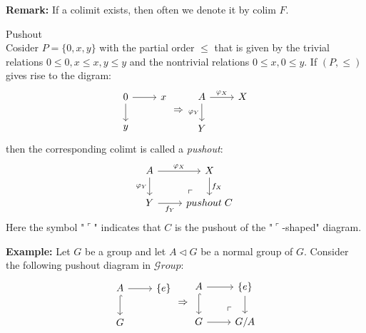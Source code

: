 \noindent\textbf{Remark:} If a colimit exists, then often we denote it by colim $F$.

\begin{definition}{Pushout}\\
Cosider $P= \{0,x,y\}$ with the partial order $\leq$ that is given by the trivial relations $0\leq 0, x\leq x, y\leq y$ and the nontrivial relations $0 \leq x, 0\leq y$. If $(P,\leq)$ gives rise to the digram:
$$\begin{tikzcd}
    0 \arrow[r] \arrow[d] &x\\
    y
\end{tikzcd} \Rightarrow \begin{tikzcd}
    A \arrow[r, "\varphi_X"] \arrow[d, "\varphi_Y"'] &X\\
    Y
\end{tikzcd}$$
then the corresponding colimt is called a \textit{pushout}:
$$\begin{tikzcd}
    A \arrow[r, "\varphi_X"] \arrow[d, "\varphi_Y"'] &X \arrow[d, "f_X"] \\
    Y \arrow[r, "f_Y"'] &pushout \; C \arrow[ul, phantom, "\ulcorner", pos=0.1]
\end{tikzcd}$$
Here the symbol "$\ulcorner$" indicates that $C$ is the pushout of the "$\ulcorner$-shaped" diagram.
\end{definition}

\noindent\textbf{Example:} Let $G$ be a group and let $A \triangleleft G$ be a normal group of $G$. Consider the following pushout diagram in $\mathcal{G}roup$:
$$\begin{tikzcd}
    A \arrow[r] \arrow[d, hook] &\{e\}\\
    G
\end{tikzcd} \Rightarrow \begin{tikzcd}
    A \arrow[r] \arrow[d, hook] &\{e\} \arrow[d] \\
    G \arrow[r] &G/A \arrow[ul, phantom, "\ulcorner", pos=0.15]
\end{tikzcd}$$

